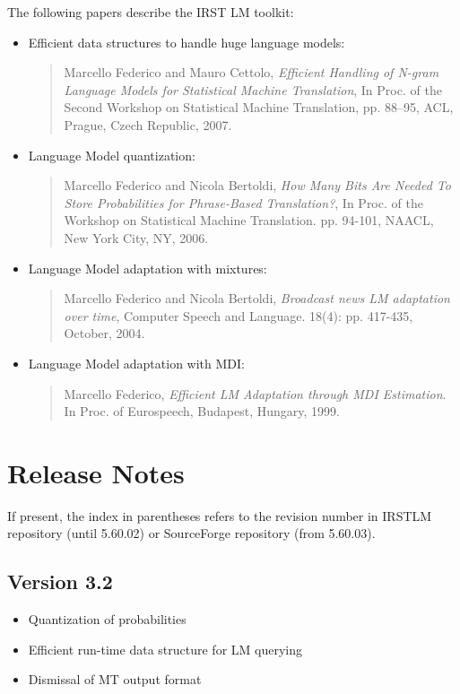 \documentclass[11pt]{article}
\newcommand{\IMPORTANT}[1]{\begin{mdframed}[linecolor=red]\noindent #1\end{mdframed}}
\begin{document}
\noindent
The following papers describe the IRST LM toolkit:
\begin{itemize}

\item Efficient data structures to handle huge language models:
\begin{quote}
Marcello Federico and Mauro Cettolo, {\em Efficient Handling of N-gram Language Models for Statistical Machine Translation}, In Proc. of the Second Workshop on Statistical Machine Translation, pp. 88--95, ACL, Prague, Czech Republic, 2007.
\end{quote}

\item Language Model quantization:
\begin{quote}
Marcello Federico and Nicola Bertoldi, {\em How Many Bits Are Needed To Store Probabilities for Phrase-Based Translation?}, In Proc. of the Workshop on Statistical Machine Translation. pp. 94-101, NAACL, New York City, NY, 2006. 
\end{quote}


\item Language Model adaptation with mixtures:
\begin{quote}
Marcello Federico and Nicola Bertoldi, {\em Broadcast news LM adaptation over time}, Computer Speech and Language. 18(4): pp. 417-435, October, 2004.
\end{quote}
\item Language Model adaptation with MDI:
\begin{quote}
Marcello Federico, {\em Efficient LM Adaptation through MDI Estimation}. In Proc. of Eurospeech, Budapest, Hungary, 1999.
\end{quote}
\end{itemize}

\newpage
\section{Release Notes}

\IMPORTANT{If present, the index in parentheses refers to the revision number in IRSTLM repository (until 5.60.02) or SourceForge repository (from 5.60.03).}
\subsection{Version 3.2}
\begin{itemize}
\item Quantization of probabilities
\item Efficient run-time data structure for LM querying 
\item Dismissal of MT output format
\end{itemize}
\end{document}
